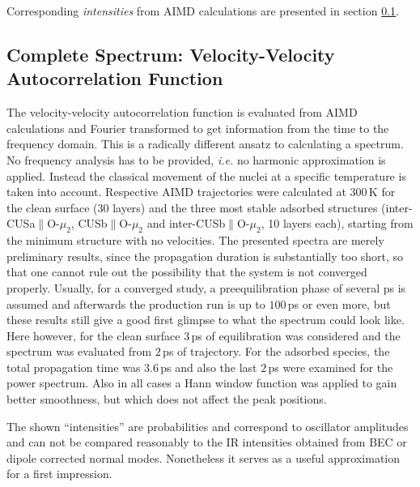 \documentclass[11pt,DIV=13,BCOR=5mm,a4paper,headinclude]{scrbook}
\begin{document}
Corresponding \textit{intensities} from AIMD calculations are presented in section \ref{vvacf}.
\clearpage
\subsection{Complete Spectrum: Velocity-Velocity Autocorrelation Function}\label{vvacf}

The velocity-velocity autocorrelation function is evaluated from AIMD calculations and Fourier transformed to get information from the time to the frequency domain.
This is a radically different ansatz to calculating a spectrum.
No frequency analysis has to be provided, \textit{i.e.} no harmonic approximation is applied.
Instead the classical movement of the nuclei at a specific temperature is taken into account.
Respective AIMD trajectories were calculated at $300\,$K for the clean surface (30 layers) and the three most stable adsorbed structures (inter-CUSa$\parallel$O-$\mu_2$, CUSb$\parallel$O-$\mu_2$ and inter-CUSb$\parallel$O-$\mu_2$, 10 layers each), starting from the minimum structure with no velocities.
The presented spectra are merely preliminary results, since the propagation duration is substantially too short, so that one cannot rule out the possibility that the system is not converged properly.
Usually, for a converged study, a preequilibration phase of several ps is assumed and afterwards the production run is up to $100\,$ps or even more, but these results still give a good first glimpse to what the spectrum could look like.
Here however, for the clean surface $3\,$ps of equilibration was considered and the spectrum was evaluated from $2\,$ps of trajectory.
For the adsorbed species, the total propagation time was $3.6\,$ps and also the last $2\,$ps were examined for the power spectrum.
Also in all cases a Hann window function was applied\cite{Ohto2015} to gain better smoothness, but which does not affect the peak positions.


The shown ``intensities'' are probabilities and correspond to oscillator amplitudes and can not be compared reasonably to the IR intensities obtained from BEC or dipole corrected normal modes.
Nonetheless it serves as a useful approximation for a first impression.
\end{document}
